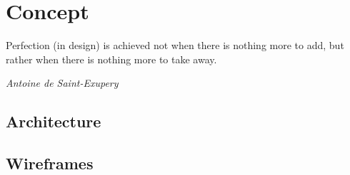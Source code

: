 \chapter{Concept} %
\epigraph{Perfection (in design) is achieved not when there is nothing more to add, but rather when there is nothing more to take away.}{\textit{Antoine de Saint-Exupery}}

\section{Architecture}

\section{Wireframes}


